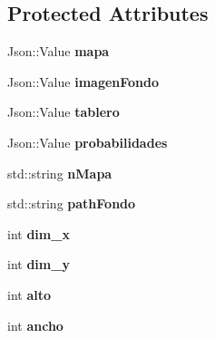 \subsection*{Protected Attributes}
\begin{DoxyCompactItemize}
\item 
\hypertarget{classTablero_aac884510dfe6cc2e32a370d3beb038f3}{Json\-::\-Value {\bfseries mapa}}\label{classTablero_aac884510dfe6cc2e32a370d3beb038f3}

\item 
\hypertarget{classTablero_ab3518a77d7eb5fca62ab3a9fa348fb86}{Json\-::\-Value {\bfseries imagen\-Fondo}}\label{classTablero_ab3518a77d7eb5fca62ab3a9fa348fb86}

\item 
\hypertarget{classTablero_a88d85c5bd82d2b07099273adbfd6d88f}{Json\-::\-Value {\bfseries tablero}}\label{classTablero_a88d85c5bd82d2b07099273adbfd6d88f}

\item 
\hypertarget{classTablero_acb775242127720f1640f1a4ac0bf880e}{Json\-::\-Value {\bfseries probabilidades}}\label{classTablero_acb775242127720f1640f1a4ac0bf880e}

\item 
\hypertarget{classTablero_adfcc095d50cedd3f67b4b5d3f743dd90}{std\-::string {\bfseries n\-Mapa}}\label{classTablero_adfcc095d50cedd3f67b4b5d3f743dd90}

\item 
\hypertarget{classTablero_aaf4796d5f170761f15d9382d0181881c}{std\-::string {\bfseries path\-Fondo}}\label{classTablero_aaf4796d5f170761f15d9382d0181881c}

\item 
\hypertarget{classTablero_ac2d4502fc9544f023fb1dafa7f6743e6}{int {\bfseries dim\-\_\-x}}\label{classTablero_ac2d4502fc9544f023fb1dafa7f6743e6}

\item 
\hypertarget{classTablero_a511a12f900ee33f4bb4f0d8843b1cb85}{int {\bfseries dim\-\_\-y}}\label{classTablero_a511a12f900ee33f4bb4f0d8843b1cb85}

\item 
\hypertarget{classTablero_a13916a0314df059f250e34787f5337ae}{int {\bfseries alto}}\label{classTablero_a13916a0314df059f250e34787f5337ae}

\item 
\hypertarget{classTablero_a3e4e97ce47d41886e2a6e9c77ccfd551}{int {\bfseries ancho}}\label{classTablero_a3e4e97ce47d41886e2a6e9c77ccfd551}

\end{DoxyCompactItemize}


